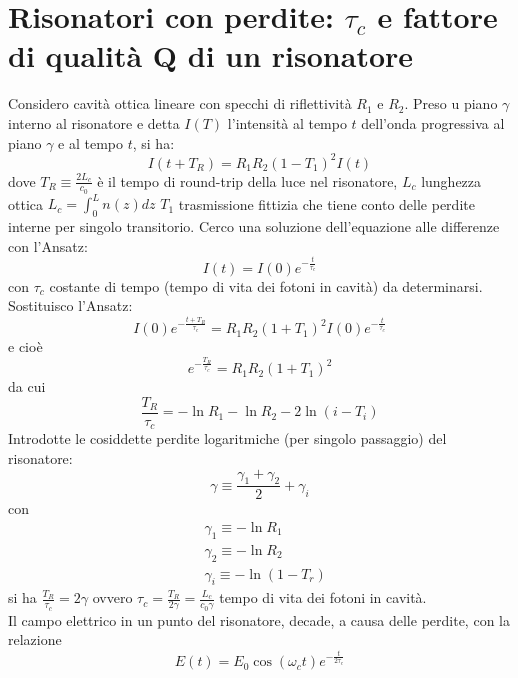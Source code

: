 \documentclass{book}
\theoremstyle{remark}
\begin{document}
\section{Risonatori con perdite: $\tau_c$ e fattore di qualità Q di un risonatore}
Considero cavità ottica lineare con specchi di riflettività $R_1$ e $R_2$. Preso u piano $\gamma$ interno al risonatore e detta $I(T)$ l'intensità al tempo $t$ dell'onda progressiva al piano $\gamma$ e al tempo $t$, si ha:
\begin{equation*}
I(t+T_R) = R_1R_2 (1-T_1)^2 I(t)
\end{equation*}
dove $T_R \equiv \frac{2L_c}{c_0}$ è il tempo di round-trip della luce nel risonatore, $L_c$ lunghezza ottica $L_c = \int_0^L n(z) dz$ $T_1$ trasmissione fittizia che tiene conto delle perdite interne per singolo transitorio.
Cerco una soluzione dell'equazione alle differenze con l'Ansatz:
\begin{equation*}
I(t) = I(0) e^{-\frac{t}{\tau_c}}
\end{equation*}
con $\tau_c$ costante di tempo (tempo di vita dei fotoni in cavità) da determinarsi. Sostituisco l'Ansatz:
\begin{equation*}
I(0) e^{-\frac{t+T_R}{\tau_c}} = R_1 R_2 (1 + T_1)^2 I(0)e^{-\frac{t}{\tau_c}}
\end{equation*}
e cioè
\begin{equation*}
e^{-\frac{T_R}{\tau_c}} = R_1 R_2 (1 + T_1)^2
\end{equation*}
da cui
\begin{equation*}
\frac{T_R}{\tau_c} = -\ln R_1 - \ln R_2 - 2 \ln(i-T_i)
\end{equation*}
Introdotte le cosiddette perdite logaritmiche (per singolo passaggio) del risonatore:
\begin{equation*}
\gamma \equiv \frac{\gamma_1 + \gamma_2}{2} + \gamma_i
\end{equation*}
con \begin{align*}
&\gamma_1 \equiv -\ln R_1\\
&\gamma_2 \equiv -\ln R_2\\
&\gamma_i \equiv -\ln (1-T_r)
\end{align*}
si ha $\frac{T_R}{\tau_c} = 2 \gamma$ ovvero $\tau_c = \frac{T_R}{2\gamma} = \frac{L_c}{c_0 \gamma}$ tempo di vita dei fotoni in cavità.
\\
Il campo elettrico in un punto del risonatore, decade, a causa delle perdite, con la relazione
\begin{equation*}
E(t) = E_0 \cos(\omega_c t) e^{-\frac{t}{2\tau_c}}
\end{equation*}
\end{document}
